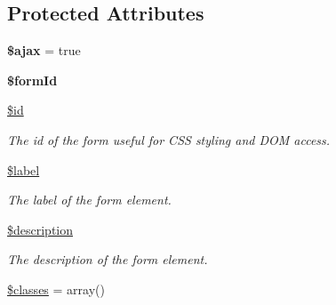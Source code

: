 \subsection*{Protected Attributes}
\begin{DoxyCompactItemize}
\item 
\hypertarget{class_element_a45fa0d21fc480fc27dc7500e71bf4095}{
{\bfseries \$ajax} = true}
\label{class_element_a45fa0d21fc480fc27dc7500e71bf4095}

\item 
\hypertarget{class_element_aa683ad294e419aa5017afeac9ad4c78b}{
{\bfseries \$formId}}
\label{class_element_aa683ad294e419aa5017afeac9ad4c78b}

\item 
\hypertarget{class_element_aedf3495e5baf06587b55084e918c99c0}{
\hyperlink{class_element_aedf3495e5baf06587b55084e918c99c0}{\$id}}
\label{class_element_aedf3495e5baf06587b55084e918c99c0}

\begin{DoxyCompactList}\small\item\em The id of the form useful for CSS styling and DOM access. \item\end{DoxyCompactList}\item 
\hypertarget{class_element_a0d812f75c07be7a8146b28112124ba41}{
\hyperlink{class_element_a0d812f75c07be7a8146b28112124ba41}{\$label}}
\label{class_element_a0d812f75c07be7a8146b28112124ba41}

\begin{DoxyCompactList}\small\item\em The label of the form element. \item\end{DoxyCompactList}\item 
\hypertarget{class_element_a4aee55ebabb674b6be00a5506696abd1}{
\hyperlink{class_element_a4aee55ebabb674b6be00a5506696abd1}{\$description}}
\label{class_element_a4aee55ebabb674b6be00a5506696abd1}

\begin{DoxyCompactList}\small\item\em The description of the form element. \item\end{DoxyCompactList}\item 
\hypertarget{class_element_a9acf578ed7eebe0d4806d4559206e4b8}{
\hyperlink{class_element_a9acf578ed7eebe0d4806d4559206e4b8}{\$classes} = array()}
\label{class_element_a9acf578ed7eebe0d4806d4559206e4b8}


\end{DoxyCompactItemize}
